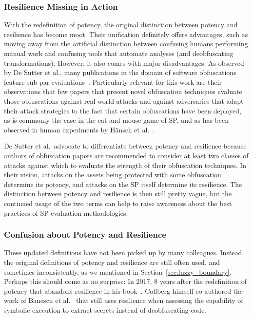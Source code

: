 \subsubsection{Resilience Missing in Action}
With the redefinition of potency, the original distinction between potency and resilience has become moot. Their unification definitely offers advantages, such as moving away from the artificial distinction between confusing humans performing manual work and confusing tools that automate analyses (and deobfuscating transformations). However, it also comes with major disadvantages. As observed by De Sutter et al., many publications in the domain of software obfuscations feature sub-par evaluations~\cite{desutter2024evaluation}. Particularly relevant for this work are their observations that few papers that present novel obfuscation techniques evaluate those obfuscations against real-world attacks and against adversaries that adapt their attack strategies to the fact that certain obfuscations have been deployed, as is commonly the case in the cat-and-mouse game of SP, and as has been observed in human experiments by H\"ansch et al.~\cite{2018_programming_experience_might_not_help_in_comprehending_obfuscated_source_code_efficiently}.

De Sutter et al.\ advocate to differentiate between potency and resilience because authors of obfuscation papers are recommended to consider at least two classes of attacks against which to evaluate the strength of their obfuscation techniques. In their vision, attacks on the assets being protected with some obfuscation determine its potency, and attacks on the SP itself determine its resilience. The distinction between potency and resilience is then still pretty vague, but the continued usage of the two terms can help to raise awareness about the best practices of SP evaluation methodologies.

\subsubsection{Confusion about Potency and Resilience}
These updated definitions have not been picked up by many colleagues. Instead, the original definitions of potency and resilience are still often used, and sometimes inconsistently, as we mentioned in Section~\ref{sec:fuzzy_boundary}. Perhaps this should come as no surprise: In 2017, 8 years after the redefinition of potency that abandons resilience in his book~\cite{collbergbook}, Collberg himself co-authored the work of Banescu et al.~\cite{2017_predicting_the_resilience_of_obfuscated_code_against_symbolic_execution_attacks_via_machine_learning} that still uses resilience when assessing the capability of symbolic execution to extract secrets instead of deobfuscating code.

